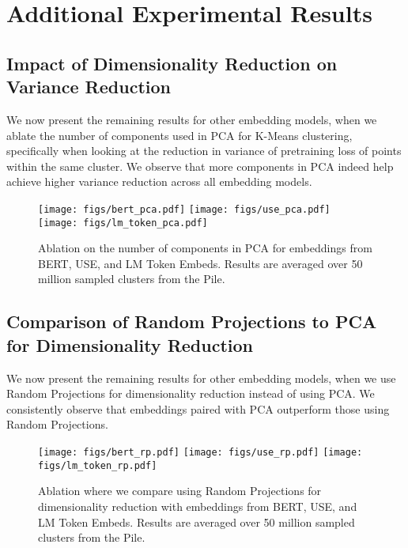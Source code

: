 \section{Additional Experimental Results} \label{appx:extra_results}

\subsection{Impact of Dimensionality Reduction on Variance Reduction} \label{appx:pca}

We now present the remaining results for other embedding models, when we ablate the number of components used in PCA for K-Means clustering, specifically when looking at the reduction in variance of pretraining loss of points within the same cluster. We observe that more components in PCA indeed help achieve higher variance reduction across all embedding models.

\begin{figure*}[h]
    \centering
    \texttt{[image: figs/bert\_pca.pdf]}
    \texttt{[image: figs/use\_pca.pdf]}
    \texttt{[image: figs/lm\_token\_pca.pdf]}
    \caption{Ablation on the number of components in PCA for embeddings from BERT, USE, and LM Token Embeds. Results are averaged over 50 million sampled clusters from the Pile.}
    \label{fig:clustering_pca_2}
\end{figure*}


\subsection{Comparison of Random Projections to PCA for Dimensionality Reduction} \label{appx:random_proj}

We now present the remaining results for other embedding models, when we use Random Projections for dimensionality reduction instead of using PCA. We consistently observe that embeddings paired with PCA outperform those using Random Projections.

\begin{figure*}[h]
    \centering
    \texttt{[image: figs/bert\_rp.pdf]}
    \texttt{[image: figs/use\_rp.pdf]}
    \texttt{[image: figs/lm\_token\_rp.pdf]}
    \caption{Ablation where we compare using Random Projections for dimensionality reduction with embeddings from BERT, USE, and LM Token Embeds. Results are averaged over 50 million sampled clusters from the Pile.}
    \label{fig:random_proj_2}
\end{figure*}


